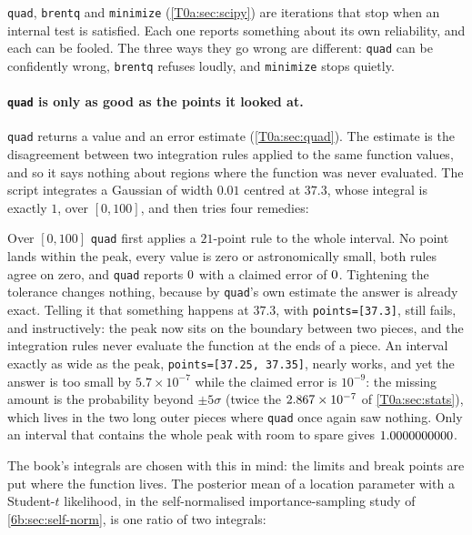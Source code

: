 \texttt{quad}, \texttt{brentq} and \texttt{minimize} (\cref{T0a:sec:scipy}) are iterations that stop when an internal test is satisfied. Each one reports something about its own reliability, and each can be fooled. The three ways they go wrong are different: \texttt{quad} can be confidently wrong, \texttt{brentq} refuses loudly, and \texttt{minimize} stops quietly.

\paragraph{\texttt{quad} is only as good as the points it looked at.} \texttt{quad} returns a value and an error estimate (\cref{T0a:sec:quad}). The estimate is the disagreement between two integration rules applied to the same function values, and so it says nothing about regions where the function was never evaluated. The script integrates a Gaussian of width $0.01$ centred at $37.3$, whose integral is exactly $1$, over $[0,100]$, and then tries four remedies:


Over $[0,100]$ \texttt{quad} first applies a $21$-point rule to the whole interval. No point lands within the peak, every value is zero or astronomically small, both rules agree on zero, and \texttt{quad} reports $0$ with a claimed error of $0$. Tightening the tolerance changes nothing, because by \texttt{quad}'s own estimate the answer is already exact. Telling it that something happens at $37.3$, with \texttt{points=[37.3]}, still fails, and instructively: the peak now sits on the boundary between two pieces, and the integration rules never evaluate the function at the ends of a piece. An interval exactly as wide as the peak, \texttt{points=[37.25, 37.35]}, nearly works, and yet the answer is too small by $5.7\times10^{-7}$ while the claimed error is $10^{-9}$: the missing amount is the probability beyond $\pm5\sigma$ (twice the $2.867\times10^{-7}$ of \cref{T0a:sec:stats}), which lives in the two long outer pieces where \texttt{quad} once again saw nothing. Only an interval that contains the whole peak with room to spare gives $1.0000000000$.

The book's integrals are chosen with this in mind: the limits and break points are put where the function lives. The posterior mean of a location parameter with a Student-$t$ likelihood, in the self-normalised importance-sampling study of \cref{6b:sec:self-norm}, is one ratio of two integrals:

